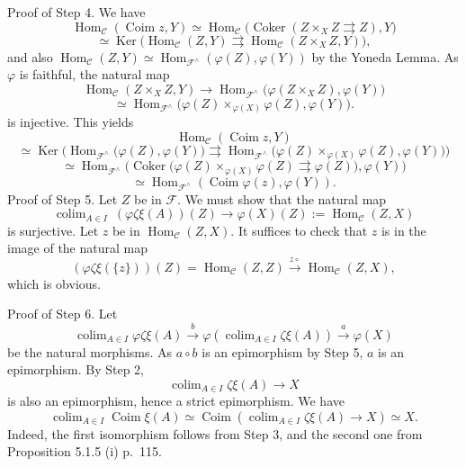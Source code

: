 \documentclass[12pt]{article}
\theoremstyle{remark}
\theoremstyle{definition}
\newcommand{\C}{\mathcal C}
\newcommand{\F}{\mathcal F}
\DeclareMathOperator*{\coli}{colim}
\DeclareMathOperator{\Coim}{Coim}
\DeclareMathOperator{\Coker}{Coker}
\DeclareMathOperator{\Hom}{Hom}%
\DeclareMathOperator{\Ker}{Ker}
\begin{document}
\noindent Proof of Step 4. We have 
$$
\Hom_\C(\Coim z,Y)\simeq\Hom_\C\big(\Coker(Z\times_XZ\rightrightarrows Z),Y\big)
$$
$$
\simeq\Ker\big(\Hom_\C(Z,Y)\rightrightarrows\Hom_\C(Z\times_XZ,Y)\big),
$$ 
and also $\Hom_\C(Z,Y)\simeq\Hom_{\F^\wedge}(\varphi(Z),\varphi(Y))$ by the Yoneda Lemma. As $\varphi$ is faithful, the natural map 
$$
\Hom_\C(Z\times_XZ,Y)\to\Hom_{\F^\wedge}\big(\varphi(Z\times_XZ),\varphi(Y)\big)
$$
$$
\simeq\Hom_{\F^\wedge}\big(\varphi(Z)\times_{\varphi(X)}\varphi(Z),\varphi(Y)\big).
$$ 
is injective. This yields 
$$
\Hom_\C(\Coim z,Y)
$$
$$
\simeq\Ker\Big(\Hom_{\F^\wedge}\big(\varphi(Z),\varphi(Y)\big)\rightrightarrows\Hom_{\F^\wedge}\big(\varphi(Z)\times_{\varphi(X)}\varphi(Z),\varphi(Y)\big)\Big)
$$
$$
\simeq\Hom_{\F^\wedge}\Big(\Coker\big(\varphi(Z)\times_{\varphi(X)}\varphi(Z)\rightrightarrows\varphi(Z)\big),\varphi(Y)\Big)
$$
$$
\simeq\Hom_{\F^\wedge}(\Coim\varphi(z),\varphi(Y)).
$$
Proof of Step 5. Let $Z$ be in $\F$. We must show that the natural map 
$$
\coli_{A\in I}\ (\varphi\zeta\xi(A))(Z)\to\varphi(X)(Z):=\Hom_\C(Z,X) 
$$
is surjective. Let $z$ be in $\Hom_\C(Z,X)$. It suffices to check that $z$ is in the image of the natural map 
$$
(\varphi\zeta\xi(\{z\}))(Z)=\Hom_\C(Z,Z)\xrightarrow{z\circ}\Hom_\C(Z,X),
$$
which is obvious. 

\noindent Proof of Step 6. Let 
$$
\coli_{A\in I}\varphi\zeta\xi(A)\xrightarrow{b}\varphi\left(\coli_{A\in I}\zeta\xi(A)\right)\xrightarrow{a}\varphi(X)
$$
be the natural morphisms. As $a\circ b$ is an epimorphism by Step 5, $a$ is an epimorphism. By Step 2, 
$$
\coli_{A\in I}\zeta\xi(A)\to X
$$ 
is also an epimorphism, hence a strict epimorphism. We have 
$$
\coli_{A\in I}\Coim\xi(A)\simeq\Coim\left(\coli_{A\in I}\zeta\xi(A)\to X\right)\simeq X.
$$ 
Indeed, the first isomorphism follows from Step 3, and the second one from Proposition 5.1.5 (i) p.~115. 
%
\end{document}
